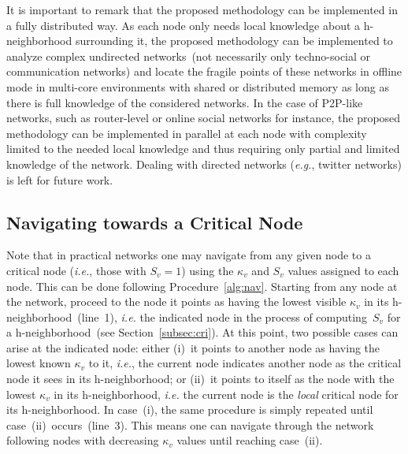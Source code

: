 \documentclass[conference,fleqn]{IEEEtran}
\begin{document}
It is important to remark that the proposed methodology can be implemented in a fully distributed way. 
As each node only needs local knowledge about a h-neighborhood surrounding it, 
the proposed methodology can be implemented to analyze complex undirected networks~(not necessarily only techno-social or communication networks)
and locate the fragile points of these networks in offline mode in multi-core environments with shared or distributed memory as long as there 
is full knowledge of the considered networks. In the case of P2P-like networks, such as router-level or online social networks
for instance, the proposed methodology can be implemented in parallel at each node with complexity limited to the needed local knowledge and 
thus requiring only partial and limited knowledge of the network. Dealing with directed networks (\textit{e.g.}, twitter networks) is left for 
future work.

\subsection{Navigating towards a Critical Node}
\label{subsec:nav}

Note that in practical networks one may navigate from any given node to a critical node (\textit{i.e.}, those with $S_v=1$) using the 
$\kappa_v$ and $S_v$ values assigned to each node.
This can be done following Procedure~\ref{alg:nav}. Starting from any node at the network, proceed to the node it points as having the lowest 
visible $\kappa_v$ in its h-neighborhood~(line~1), \textit{i.e.} the indicated node in the process of computing~$S_v$ for a 
h-neighborhood~(see Section~\ref{subsec:cri}).
At this point, two possible cases can arise at the indicated node: 
either (i)~it points to another node as having the lowest known $\kappa_v$ to it, \textit{i.e.}, the current node indicates another
node as the critical node it sees in its h-neighborhood; or
(ii)~it points to itself as the node with the lowest $\kappa_v$ in its h-neighborhood, \textit{i.e.} the current
node is the \emph{local} critical node for its h-neighborhood.
In case~(i), the same procedure is simply repeated until case~(ii)~occurs~(line~3). This means one can navigate through the network
following nodes with decreasing $\kappa_v$ values until reaching case~(ii). 
\end{document}
